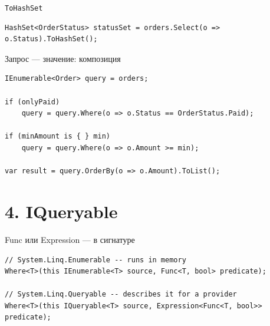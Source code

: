 \documentclass[aspectratio=169,10pt,t]{beamer}
\begin{document}
\begin{frame}[fragile]{\texttt{ToHashSet}}
  \slidetop
\begin{lstlisting}[style=csharp,basicstyle=\ttfamily\small]
HashSet<OrderStatus> statusSet = orders.Select(o => o.Status).ToHashSet();
\end{lstlisting}
  \slidegap
\end{frame}

\begin{frame}[fragile]{Запрос --- значение: композиция}
  \slidetop
\begin{lstlisting}[style=csharp,basicstyle=\ttfamily\small]
IEnumerable<Order> query = orders;

if (onlyPaid)
    query = query.Where(o => o.Status == OrderStatus.Paid);

if (minAmount is { } min)
    query = query.Where(o => o.Amount >= min);

var result = query.OrderBy(o => o.Amount).ToList();
\end{lstlisting}

  \slidegap
\end{frame}

\begin{frame}[plain]
\end{frame}

\section{4. IQueryable}

\begin{frame}[plain]
\end{frame}

\begin{frame}[fragile]{Func или Expression --- в сигнатуре}
  \slidetop
\begin{lstlisting}[style=csharp,basicstyle=\ttfamily\small]
// System.Linq.Enumerable -- runs in memory
Where<T>(this IEnumerable<T> source, Func<T, bool> predicate);

// System.Linq.Queryable -- describes it for a provider
Where<T>(this IQueryable<T> source, Expression<Func<T, bool>> predicate);
\end{lstlisting}

  \slidegap
\end{frame}
\end{document}
